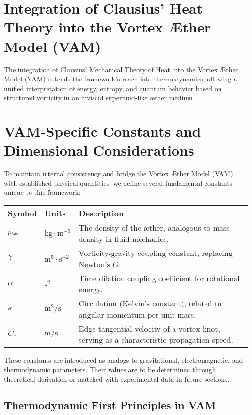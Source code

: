 

\section{Integration of Clausius' Heat Theory into the Vortex \AE ther Model (VAM)}

The integration of Clausius' Mechanical Theory of Heat into the Vortex \AE ther Model (VAM) extends the framework's reach into thermodynamics,
allowing a unified interpretation of energy, entropy, and quantum behavior based on structured vorticity in an inviscid superfluid-like \ae ther
medium \cite{clausius1865mechanical, maxwell1865electromagnetic, helmholtz1858integrals}.

\section{VAM-Specific Constants and Dimensional Considerations}

To maintain internal consistency and bridge the Vortex \AE ther Model (VAM) with established physical quantities, we define several fundamental constants unique to this framework:

\begin{tabular}{lll}
    \toprule
    Symbol & Units & Description \\
    \midrule
    $\rho_{\ae}$ & $\text{kg}\cdot\text{m}^{-3}$ & The density of the æther, analogous to mass density in fluid mechanics. \\
    $\gamma$ & $\text{m}^5 \cdot \text{s}^{-2}$ & Vorticity-gravity coupling constant, replacing Newton's $G$. \\
    $\alpha$ & $\text{s}^2$ & Time dilation coupling coefficient for rotational energy. \\
    $\kappa$ & $\text{m}^2/\text{s}$ & Circulation (Kelvin's constant), related to angular momentum per unit mass. \\
    $C_e$ & $\text{m}/\text{s}$ & Edge tangential velocity of a vortex knot, serving as a characteristic propagation speed. \\
    \bottomrule
\end{tabular}

These constants are introduced as analogs to gravitational, electromagnetic, and thermodynamic parameters. Their values are to be determined through theoretical derivation or matched with experimental data in future sections.

\subsection{Thermodynamic First Principles in VAM}

